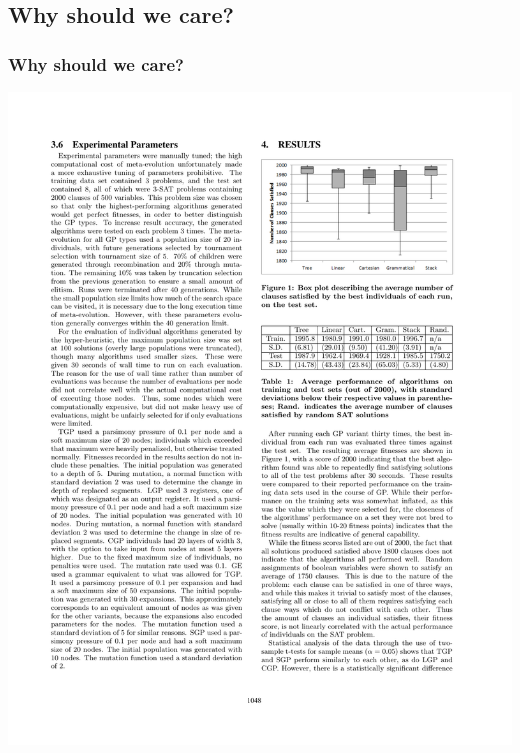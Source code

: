 \documentclass{beamer}
\newcommand{\linespace}{\vskip 0.25cm}
\begin{document}
\subsection{Why should we care?}
\begin{frame}
	\frametitle{Why should we care?}
	\includegraphics[width=1\textwidth]{Illustrations/gpvariant_graph.PDF}
	\linespace
	\centering
\end{frame}
\end{document}
